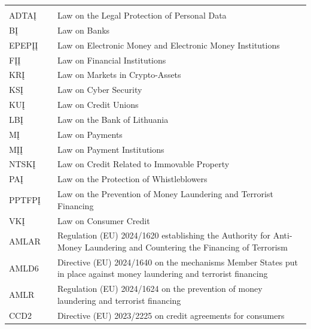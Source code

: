 \begin{xltabular}{\textwidth}{@{}L{20mm}YY@{}}
\toprule
{} &  &  \\
\midrule
\endfirsthead
\toprule
{} &  &  \\
\midrule
\endhead
\bottomrule
\endlastfoot
ADTAĮ &  & Law on the Legal Protection of Personal Data \\
BĮ &  & Law on Banks \\
EPEPĮĮ &  & Law on Electronic Money and Electronic Money Institutions \\
FĮĮ &  & Law on Financial Institutions \\
KRĮ &  & Law on Markets in Crypto-Assets \\
KSĮ &  & Law on Cyber Security \\
KUĮ &  & Law on Credit Unions \\
LBĮ &  & Law on the Bank of Lithuania \\
MĮ &  & Law on Payments \\
MĮĮ &  & Law on Payment Institutions \\
NTSKĮ &  & Law on Credit Related to Immovable Property \\
PAĮ &  & Law on the Protection of Whistleblowers \\
PPTFPĮ &  & Law on the Prevention of Money Laundering and Terrorist Financing \\
VKĮ &  & Law on Consumer Credit \\
\midrule
AMLAR & & Regulation (EU) 2024/1620 establishing the Authority for Anti-Money Laundering and Countering the Financing of Terrorism \\
AMLD6 & & Directive (EU) 2024/1640 on the mechanisms Member States put in place against money laundering and terrorist financing \\
AMLR & & Regulation (EU) 2024/1624 on the prevention of money laundering and terrorist financing \\
CCD2 & & Directive (EU) 2023/2225 on credit agreements for consumers \\

\end{xltabular}
